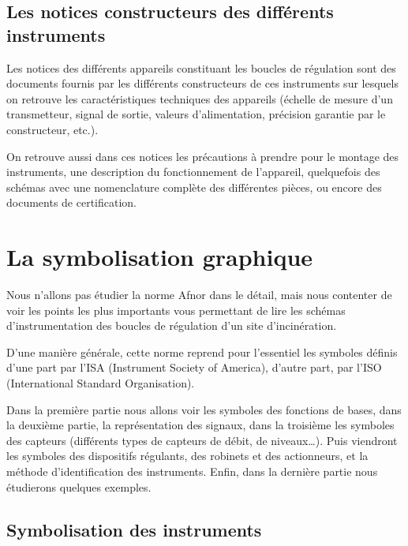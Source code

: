 \subsection{Les notices constructeurs des différents instruments}

Les notices des différents appareils constituant les boucles de régulation sont des documents fournis par les différents constructeurs de ces instruments sur lesquels on retrouve les caractéristiques techniques des appareils (échelle de mesure d’un transmetteur, signal de sortie, valeurs d’alimentation, précision garantie par le constructeur, etc.). 
\vspace{0.3cm}

On retrouve aussi dans ces notices les précautions à prendre pour le montage des instruments, une description du fonctionnement de l’appareil, quelquefois des schémas avec une nomenclature complète des différentes pièces, ou encore des documents de certification.



\section{La symbolisation graphique}

Nous n’allons pas étudier la norme Afnor dans le détail, mais nous contenter de voir les points les plus importants vous permettant de lire les schémas d’instrumentation des boucles de régulation d’un site d’incinération.
\vspace{0.3cm}

D’une manière générale, cette norme reprend pour l’essentiel les symboles définis d’une part par l’ISA (Instrument Society of America), d’autre part, par l’ISO (International Standard Organisation).
\vspace{0.3cm}

Dans la première partie nous allons voir les symboles des fonctions de bases, dans la deuxième partie, la représentation des signaux, dans la troisième les symboles des capteurs (différents types de capteurs de débit, de niveaux…). Puis viendront les symboles des dispositifs régulants, des robinets et des actionneurs, et la méthode d’identification des instruments. Enfin, dans la dernière partie nous étudierons quelques exemples.



\subsection{Symbolisation des instruments}


